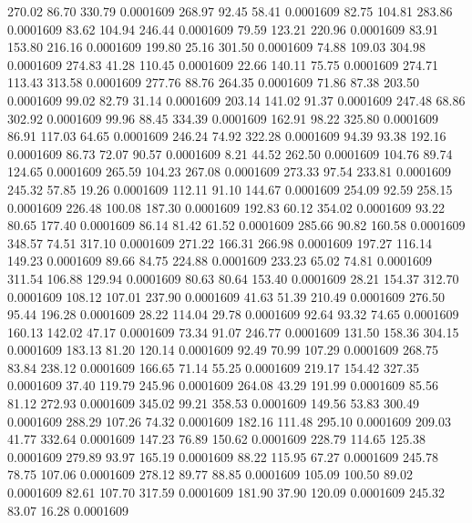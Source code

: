  270.02   86.70  330.79   0.0001609
 268.97   92.45   58.41   0.0001609
  82.75  104.81  283.86   0.0001609
  83.62  104.94  246.44   0.0001609
  79.59  123.21  220.96   0.0001609
  83.91  153.80  216.16   0.0001609
 199.80   25.16  301.50   0.0001609
  74.88  109.03  304.98   0.0001609
 274.83   41.28  110.45   0.0001609
  22.66  140.11   75.75   0.0001609
 274.71  113.43  313.58   0.0001609
 277.76   88.76  264.35   0.0001609
  71.86   87.38  203.50   0.0001609
  99.02   82.79   31.14   0.0001609
 203.14  141.02   91.37   0.0001609
 247.48   68.86  302.92   0.0001609
  99.96   88.45  334.39   0.0001609
 162.91   98.22  325.80   0.0001609
  86.91  117.03   64.65   0.0001609
 246.24   74.92  322.28   0.0001609
  94.39   93.38  192.16   0.0001609
  86.73   72.07   90.57   0.0001609
   8.21   44.52  262.50   0.0001609
 104.76   89.74  124.65   0.0001609
 265.59  104.23  267.08   0.0001609
 273.33   97.54  233.81   0.0001609
 245.32   57.85   19.26   0.0001609
 112.11   91.10  144.67   0.0001609
 254.09   92.59  258.15   0.0001609
 226.48  100.08  187.30   0.0001609
 192.83   60.12  354.02   0.0001609
  93.22   80.65  177.40   0.0001609
  86.14   81.42   61.52   0.0001609
 285.66   90.82  160.58   0.0001609
 348.57   74.51  317.10   0.0001609
 271.22  166.31  266.98   0.0001609
 197.27  116.14  149.23   0.0001609
  89.66   84.75  224.88   0.0001609
 233.23   65.02   74.81   0.0001609
 311.54  106.88  129.94   0.0001609
  80.63   80.64  153.40   0.0001609
  28.21  154.37  312.70   0.0001609
 108.12  107.01  237.90   0.0001609
  41.63   51.39  210.49   0.0001609
 276.50   95.44  196.28   0.0001609
  28.22  114.04   29.78   0.0001609
  92.64   93.32   74.65   0.0001609
 160.13  142.02   47.17   0.0001609
  73.34   91.07  246.77   0.0001609
 131.50  158.36  304.15   0.0001609
 183.13   81.20  120.14   0.0001609
  92.49   70.99  107.29   0.0001609
 268.75   83.84  238.12   0.0001609
 166.65   71.14   55.25   0.0001609
 219.17  154.42  327.35   0.0001609
  37.40  119.79  245.96   0.0001609
 264.08   43.29  191.99   0.0001609
  85.56   81.12  272.93   0.0001609
 345.02   99.21  358.53   0.0001609
 149.56   53.83  300.49   0.0001609
 288.29  107.26   74.32   0.0001609
 182.16  111.48  295.10   0.0001609
 209.03   41.77  332.64   0.0001609
 147.23   76.89  150.62   0.0001609
 228.79  114.65  125.38   0.0001609
 279.89   93.97  165.19   0.0001609
  88.22  115.95   67.27   0.0001609
 245.78   78.75  107.06   0.0001609
 278.12   89.77   88.85   0.0001609
 105.09  100.50   89.02   0.0001609
  82.61  107.70  317.59   0.0001609
 181.90   37.90  120.09   0.0001609
 245.32   83.07   16.28   0.0001609
